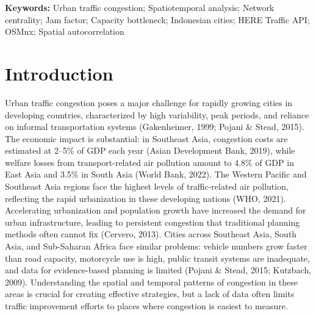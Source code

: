 \documentclass[12pt,a4paper]{article}
\begin{document}
\noindent\textbf{Keywords:} Urban traffic congestion; Spatiotemporal analysis; Network centrality; Jam factor; Capacity bottleneck; Indonesian cities; HERE Traffic API; OSMnx; Spatial autocorrelation

\newpage

\section{Introduction}

Urban traffic congestion poses a major challenge for rapidly growing cities in developing countries, characterized by high variability, peak periods, and reliance on informal transportation systems (Gakenheimer, 1999; Pojani \& Stead, 2015). The economic impact is substantial: in Southeast Asia, congestion costs are estimated at 2–5\% of GDP each year (Asian Development Bank, 2019), while welfare losses from transport-related air pollution amount to 4.8\% of GDP in East Asia and 3.5\% in South Asia (World Bank, 2022). The Western Pacific and Southeast Asia regions face the highest levels of traffic-related air pollution, reflecting the rapid urbanization in these developing nations (WHO, 2021). Accelerating urbanization and population growth have increased the demand for urban infrastructure, leading to persistent congestion that traditional planning methods often cannot fix (Cervero, 2013). Cities across Southeast Asia, South Asia, and Sub-Saharan Africa face similar problems: vehicle numbers grow faster than road capacity, motorcycle use is high, public transit systems are inadequate, and data for evidence-based planning is limited (Pojani \& Stead, 2015; Kutzbach, 2009). Understanding the spatial and temporal patterns of congestion in these areas is crucial for creating effective strategies, but a lack of data often limits traffic improvement efforts to places where congestion is easiest to measure.
\end{document}
